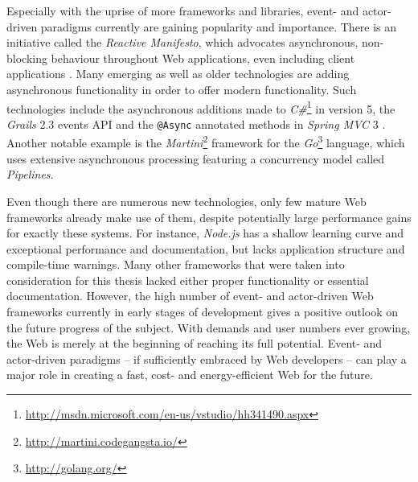 Especially with the uprise of more frameworks and libraries, event- and actor-driven paradigms currently are gaining popularity and importance. There is an initiative called the \textit{Reactive Manifesto}, which advocates asynchronous, non-blocking behaviour throughout Web applications, even including client applications \cite{reactive}. Many emerging as well as older technologies are adding asynchronous functionality in order to offer modern functionality. Such technologies include the asynchronous additions made to \textit{C\#}\footnote{\url{http://msdn.microsoft.com/en-us/vstudio/hh341490.aspx}} in version 5, the \textit{Grails} 2.3 events API and the \texttt{@Async} annotated methods in \textit{Spring MVC} 3 \cite{Syme1983} \cite{Ledbrook2013}. Another notable example is the \textit{Martini}\footnote{\url{http://martini.codegangsta.io/}} framework for the \textit{Go}\footnote{\url{http://golang.org/}} language, which uses extensive asynchronous processing featuring a concurrency model called \textit{Pipelines}.

Even though there are numerous new technologies, only few mature Web frameworks already make use of them, despite potentially large performance gains for exactly these systems. For instance, \textit{Node.js} has a shallow learning curve and exceptional performance and documentation, but lacks application structure and compile-time warnings. Many other frameworks that were taken into consideration for this thesis lacked either proper functionality or essential documentation. However, the high number of event- and actor-driven Web frameworks currently in early stages of development gives a positive outlook on the future progress of the subject. With demands and user numbers ever growing, the Web is merely at the beginning of reaching its full potential. Event- and actor-driven paradigms -- if sufficiently embraced by Web developers -- can play a major role in creating a fast, cost- and energy-efficient Web for the future.